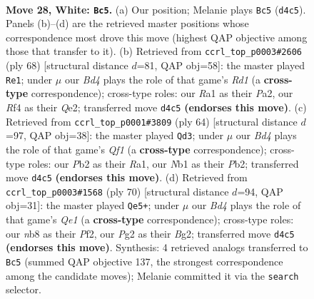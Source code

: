 \documentclass[11pt]{article}
\begin{document}
\clearpage

\begin{figure}[p]\centering
\begin{subfigure}{0.46\textwidth}\centering
\resizebox{\linewidth}{!}{%
\newchessgame
\chessboard[
  setfen={rnbk4/8/4q3/p2p4/1p1B1R2/6r1/PPPQ2P1/RN4K1 w - - 2 28},
  showmover=false,
  pgfstyle=straightmove, color=movearrow, markmove={d4-c5}
]}
\caption{}
\end{subfigure}\hfill
\begin{subfigure}{0.46\textwidth}\centering
\resizebox{\linewidth}{!}{%
\newchessgame
\chessboard[
  setfen={8/5k1p/p1pq3B/3r1bP1/1P1P1p2/8/P3QP2/3R2K1 w - - 1 35},
  showmover=false,
  pgfstyle=straightmove, color=movearrow, markmove={d1-e1}
]}
\caption{}
\end{subfigure}
\\[4pt]
\begin{subfigure}{0.46\textwidth}\centering
\resizebox{\linewidth}{!}{%
\newchessgame
\chessboard[
  setfen={6k1/4r1p1/pp1p2q1/3P1rn1/P7/2R2PB1/1P5P/R4Q1K w - - 1 33},
  showmover=false,
  pgfstyle=straightmove, color=movearrow, markmove={f1-d3}
]}
\caption{}
\end{subfigure}\hfill
\begin{subfigure}{0.46\textwidth}\centering
\resizebox{\linewidth}{!}{%
\newchessgame
\chessboard[
  setfen={3rNr1k/7p/p3R3/5pq1/P1p2p2/1nP4P/5PB1/4Q1K1 w - - 2 36},
  showmover=false,
  pgfstyle=straightmove, color=movearrow, markmove={e1-e5}
]}
\caption{}
\end{subfigure}
\caption{\textbf{Move 28, White: \texttt{Bc5}.} (a) Our position; Melanie plays \texttt{Bc5} (\texttt{d4c5}). Panels (b)--(d) are the retrieved master positions whose correspondence most drove this move (highest QAP objective among those that transfer to it). (b) Retrieved from \texttt{ccrl\_top\_p0003\#2606} (ply 68) [structural distance $d$=81, QAP obj=58]: the master played \texttt{Re1}; under $\mu$ our \emph{Bd4} plays the role of that game's \emph{Rd1} (a \textbf{cross-type} correspondence); cross-type roles: our \emph{R}a1 as their \emph{P}a2, our \emph{R}f4 as their \emph{Q}e2; transferred move \texttt{d4c5} \textbf{(endorses this move)}. (c) Retrieved from \texttt{ccrl\_top\_p0001\#3809} (ply 64) [structural distance $d$=97, QAP obj=38]: the master played \texttt{Qd3}; under $\mu$ our \emph{Bd4} plays the role of that game's \emph{Qf1} (a \textbf{cross-type} correspondence); cross-type roles: our \emph{P}b2 as their \emph{R}a1, our \emph{N}b1 as their \emph{P}b2; transferred move \texttt{d4c5} \textbf{(endorses this move)}. (d) Retrieved from \texttt{ccrl\_top\_p0003\#1568} (ply 70) [structural distance $d$=94, QAP obj=31]: the master played \texttt{Qe5+}; under $\mu$ our \emph{Bd4} plays the role of that game's \emph{Qe1} (a \textbf{cross-type} correspondence); cross-type roles: our \emph{n}b8 as their \emph{P}f2, our \emph{P}g2 as their \emph{B}g2; transferred move \texttt{d4c5} \textbf{(endorses this move)}. Synthesis: 4 retrieved analogs transferred to \texttt{Bc5} (summed QAP objective 137, the strongest correspondence among the candidate moves); Melanie committed it via the \texttt{search} selector.}
\label{fig:thought-m54}
\end{figure}
\end{document}
